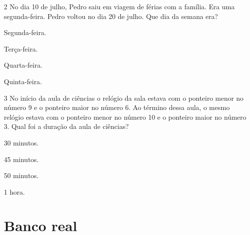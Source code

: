 \num{2} No dia 10 de julho, Pedro saiu em viagem de férias com a família. Era
uma segunda-feira. Pedro voltou no dia 20 de julho. Que dia da semana
era?

\begin{minipage}{.5\textwidth}
\begin{escolha}
\item Segunda-feira.

\item Terça-feira.

\item Quarta-feira.

\item Quinta-feira.
\end{escolha}
\end{minipage}

\num{3} No início da aula de ciências o relógio da sala estava com o ponteiro
menor no número 9 e o ponteiro maior no número 6. Ao término dessa
aula, o mesmo relógio estava com o ponteiro menor no número
10 e o ponteiro maior no número 3. Qual foi a duração da aula de
ciências?

\begin{minipage}{.5\textwidth}
\begin{escolha}
\item 30 minutos.

\item 45 minutos.

\item 50 minutos.

\item 1 hora.
\end{escolha}
\end{minipage}

\chapter{Banco real}

